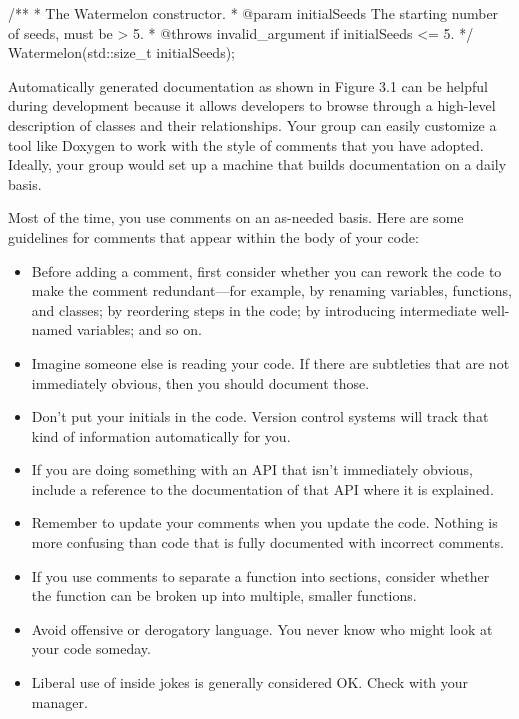 \begin{cpp}
/**
 * The Watermelon constructor.
 * @param initialSeeds The starting number of seeds, must be > 5.
 * @throws invalid_argument if initialSeeds <= 5.
 */
Watermelon(std::size_t initialSeeds);
\end{cpp}


Automatically generated documentation as shown in Figure 3.1 can be helpful during development because it allows developers to browse through a high-level description of classes and their relationships. Your group can easily customize a tool like Doxygen to work with the style of comments that you have adopted. Ideally, your group would set up a machine that builds documentation on a daily basis.


Most of the time, you use comments on an as-needed basis. Here are some guidelines for comments that appear within the body of your code:

\begin{itemize}
\item
Before adding a comment, first consider whether you can rework the code to make the comment redundant—for example, by renaming variables, functions, and classes; by reordering steps in the code; by introducing intermediate well-named variables; and so on.

\item
Imagine someone else is reading your code. If there are subtleties that are not immediately obvious, then you should document those.

\item
Don’t put your initials in the code. Version control systems will track that kind of information automatically for you.

\item
If you are doing something with an API that isn’t immediately obvious, include a reference to the documentation of that API where it is explained.

\item
Remember to update your comments when you update the code. Nothing is more confusing than code that is fully documented with incorrect comments.

\item
If you use comments to separate a function into sections, consider whether the function can be broken up into multiple, smaller functions.

\item
Avoid offensive or derogatory language. You never know who might look at your code someday.

\item
Liberal use of inside jokes is generally considered OK. Check with your manager.
\end{itemize}

